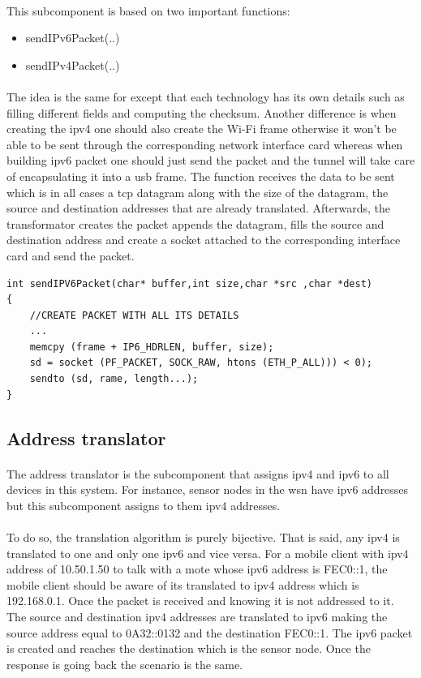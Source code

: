 \documentclass[oneside,12pt,a4paper,final]{book}
\begin{document}
\paragraph{}
This subcomponent is based on two important functions:
\begin{itemize}
\item sendIPv6Packet(..)
\item sendIPv4Packet(..)
\end{itemize}
\paragraph{}
The idea is the same for except that each technology has its own details such as filling different fields and computing the checksum. Another difference is when creating the \gls{ipv4} one should also create the Wi-Fi frame otherwise it won't be able to be sent through the corresponding network interface card whereas when building \gls{ipv6} packet one should just send the packet and the tunnel will take care of encapsulating it into a \gls{usb} frame.
The function receives the data to be sent which is in all cases a \gls{tcp} datagram along with the size of the datagram, the source and destination addresses that are already translated. Afterwards, the transformator creates the packet appends the datagram, fills the source and destination address and create a socket attached to the corresponding interface card and send the packet.
\begin{lstlisting}
int sendIPV6Packet(char* buffer,int size,char *src ,char *dest)
{
	//CREATE PACKET WITH ALL ITS DETAILS
	...
	memcpy (frame + IP6_HDRLEN, buffer, size);
	sd = socket (PF_PACKET, SOCK_RAW, htons (ETH_P_ALL))) < 0);
	sendto (sd, rame, length...);
}
\end{lstlisting}

\subsection{Address translator}
\paragraph{}
The address translator is the subcomponent that assigns \gls{ipv4} and \gls{ipv6} to all devices in this system. For instance, sensor nodes in the \gls{wsn} have \gls{ipv6} addresses but this subcomponent assigns to them \gls{ipv4} addresses.
\paragraph{}
To do so, the translation algorithm is purely bijective. That is said, any \gls{ipv4} is translated to one and only one \gls{ipv6} and vice versa. For a mobile client with \gls{ipv4} address of 10.50.1.50 to talk with a mote whose \gls{ipv6} address is FEC0::1, the mobile client should be aware of its translated to \gls{ipv4} address which is 192.168.0.1. Once the packet is received and knowing it is not addressed to it. The source and destination \gls{ipv4} addresses are translated to \gls{ipv6} making the source address equal to 0A32::0132 and the destination FEC0::1. The \gls{ipv6} packet is created and reaches the destination which is the sensor node. Once the response is going back the scenario is the same.
\end{document}

